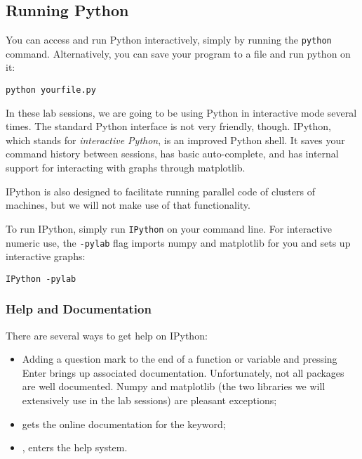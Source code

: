 \subsection{Running Python}

You can access and run Python interactively, simply by running the
\texttt{python} command. Alternatively, you can save your program to a file
and run python on it:

\begin{verbatim}
python yourfile.py
\end{verbatim}

In these lab sessions, we are going to be using Python in interactive mode
several times. The standard Python interface is not very friendly, though.
IPython, which stands for \emph{interactive Python}, is an improved Python
shell. It saves your command history between sessions, has basic auto-complete,
and has internal support for interacting with graphs through matplotlib.

IPython is also designed to facilitate running parallel code of clusters of
machines, but we will not make use of that functionality.

To run IPython, simply run \texttt{IPython} on your command line. For
interactive numeric use, the \texttt{-pylab} flag imports numpy and matplotlib
for you and sets up interactive graphs:

\begin{verbatim}
IPython -pylab
\end{verbatim}


\subsubsection{Help and Documentation}

There are several ways to get help on IPython:

\begin{itemize}
\item Adding a question mark to the end of a function or variable and pressing Enter brings up associated documentation. Unfortunately, not all packages are well documented. Numpy and matplotlib (the two libraries we will extensively use in the lab sessions) are pleasant exceptions;
\item {} gets the online documentation for the  keyword;
\item {}, enters the help system.
\end{itemize}

